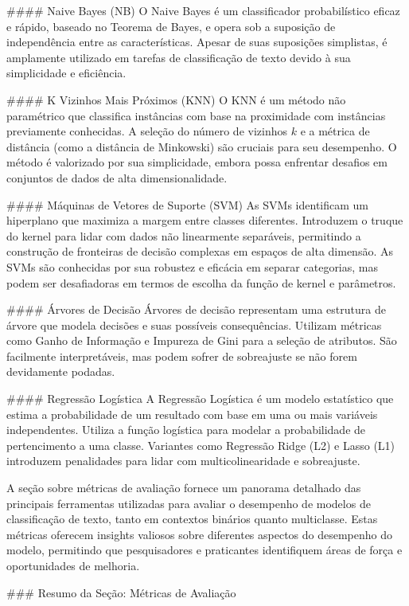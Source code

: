 {#### Naive Bayes (NB)
O Naive Bayes é um classificador probabilístico eficaz e rápido, baseado no Teorema de Bayes, e opera sob a suposição de independência entre as características. Apesar de suas suposições simplistas, é amplamente utilizado em tarefas de classificação de texto devido à sua simplicidade e eficiência.

#### K Vizinhos Mais Próximos (KNN)
O KNN é um método não paramétrico que classifica instâncias com base na proximidade com instâncias previamente conhecidas. A seleção do número de vizinhos \(k\) e a métrica de distância (como a distância de Minkowski) são cruciais para seu desempenho. O método é valorizado por sua simplicidade, embora possa enfrentar desafios em conjuntos de dados de alta dimensionalidade.

#### Máquinas de Vetores de Suporte (SVM)
As SVMs identificam um hiperplano que maximiza a margem entre classes diferentes. Introduzem o truque do kernel para lidar com dados não linearmente separáveis, permitindo a construção de fronteiras de decisão complexas em espaços de alta dimensão. As SVMs são conhecidas por sua robustez e eficácia em separar categorias, mas podem ser desafiadoras em termos de escolha da função de kernel e parâmetros.

#### Árvores de Decisão
Árvores de decisão representam uma estrutura de árvore que modela decisões e suas possíveis consequências. Utilizam métricas como Ganho de Informação e Impureza de Gini para a seleção de atributos. São facilmente interpretáveis, mas podem sofrer de sobreajuste se não forem devidamente podadas.

#### Regressão Logística
A Regressão Logística é um modelo estatístico que estima a probabilidade de um resultado com base em uma ou mais variáveis independentes. Utiliza a função logística para modelar a probabilidade de pertencimento a uma classe. Variantes como Regressão Ridge (L2) e Lasso (L1) introduzem penalidades para lidar com multicolinearidade e sobreajuste.

A seção sobre métricas de avaliação fornece um panorama detalhado das principais ferramentas utilizadas para avaliar o desempenho de modelos de classificação de texto, tanto em contextos binários quanto multiclasse. Estas métricas oferecem insights valiosos sobre diferentes aspectos do desempenho do modelo, permitindo que pesquisadores e praticantes identifiquem áreas de força e oportunidades de melhoria.

### Resumo da Seção: Métricas de Avaliação

}
